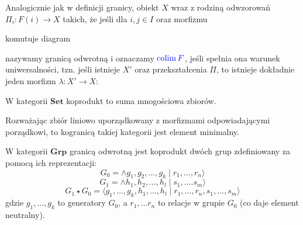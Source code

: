 \begin{definition}
  Analogicznie jak w definicji granicy, obiekt $X$ wraz z rodziną odwzorowań $\Pi_i:F(i)\to X$ takich, że jeśli dla $i,j\in I$ oraz morfizmu  komutuje diagram
  \begin{center}\end{center}
  nazywamy granicą odwrotną i oznaczamy $\color{blue}\operatorname{colim} F$, jeśli spełnia ona warunek uniwersalności, tzn. jeśli istnieje $X'$ oraz przekształcenia $\Pi$, to istnieje dokładnie jeden morfizm $\lambda:X'\to X$:
  \begin{center}\end{center}
\end{definition}

\begin{example}
\item W kategorii $\mathbf{Set}$ koprodukt to suma mnogościowa zbiorów.
\item Rozważając zbiór liniowo uporządkowany z morfizmami odpowiadającymi porządkowi, to kogranicą takiej kategorii jest element minimalny.
\item W kategorii $\mathbf{Grp}$ granicą odwrotną jest koprodukt dwóch grup zdefiniowany za pomocą ich reprezentacji:
  $$G_0=\land g_1, g_2,...,g_k\;|\;r_1,...,r_n\rangle$$
  $$G_1=\land h_1, h_2,...,h_l\;|\;s_1,....s_m\rangle$$
  $$G_1\star G_0=\langle g_1,...,g_k, h_1,...,h_l\;|\;r_1,...,r_n, s_1,...,s_m\rangle$$
  gdzie $g_1,...,g_k$ to generatory $G_0$, a $r_1,...r_n$ to relacje w grupie $G_0$ (co daje element neutralny).
\end{example}
